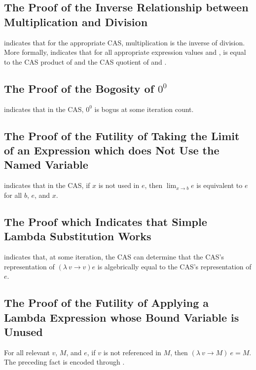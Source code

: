 \documentclass{report}
\begin{document}
\subsection{The Proof of the Inverse Relationship between Multiplication and Division}
 indicates that for the appropriate CAS, multiplication is the inverse of division.  More formally,   indicates that for all appropriate expression values  and ,  is equal to the  CAS product of  and the  CAS quotient of  and .

\subsection{The Proof of the Bogosity of \(0^0\)}
  indicates that in the  CAS, \(0^0\) is bogus at some iteration count.

\subsection{The Proof of the Futility of Taking the Limit of an Expression which does Not Use the Named Variable}
  indicates that in the  CAS, if \(x\) is not used in \(e\), then \(\lim_{x \rightarrow b} e\) is equivalent to \(e\) for all \(b\), \(e\), and \(x\).

\subsection{The Proof which Indicates that Simple Lambda Substitution Works}
  indicates that, at some iteration, the  CAS can determine that the  CAS's representation of \(\left(\lambda\ v \rightarrow v\right) e\) is algebrically equal to the  CAS's representation of \(e\).

\subsection{The Proof of the Futility of Applying a Lambda Expression whose Bound Variable is Unused}
For all relevant \(v\), \(M\), and \(e\), if \(v\) is not referenced in \(M\), then \(\left(\lambda\ v \rightarrow M\right)\ e = M\).  The preceding fact is encoded through .
\end{document}
